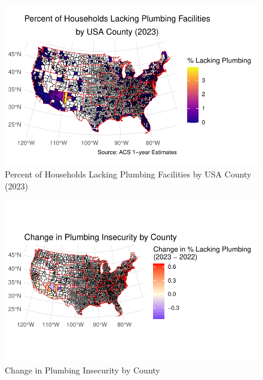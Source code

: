 \documentclass[
  letterpaper,
  DIV=11,
  numbers=noendperiod]{scrartcl}
\begin{document}
\begin{figure}[H]

{\centering \includegraphics{report_files/figure-pdf/fig-2-1.pdf}

}

\caption{\label{fig-2}Percent of Households Lacking Plumbing Facilities
by USA County (2023)}

\end{figure}

\begin{figure}[H]

{\centering \includegraphics{report_files/figure-pdf/fig-3-1.pdf}

}

\caption{\label{fig-3}Change in Plumbing Insecurity by County}

\end{figure}
\end{document}
